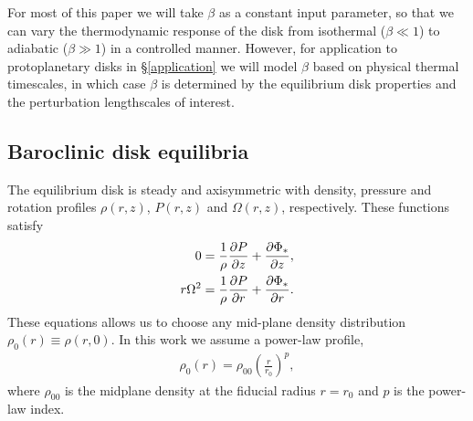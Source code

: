 For most of this paper we will take $\beta$ as a constant input
parameter, so that we can vary the thermodynamic response of the
disk from isothermal ($\beta\ll 1$) to adiabatic ($\beta \gg 1$) in a
controlled manner. However, for application to protoplanetary disks in 
\S\ref{application} we will model $\beta$ based on physical thermal
timescales, in which case $\beta$ is determined by the equilibrium
disk properties and the perturbation lengthscales of interest.  

\subsection{Baroclinic disk equilibria}\label{eqm}
The equilibrium disk is steady and axisymmetric with density,
pressure and rotation profiles $\rho(r,z)$, $P(r,z)$ and
$\Omega(r,z)$, respectively. These functions satisfy  
\begin{align}
  0 &= \frac{1}{\rho}\frac{\partial P}{\partial z} + \frac{\partial \Phi_*}{\partial z},\label{vert_equilibrium}\\
  r\Omega^2&= \frac{1}{\rho}\frac{\partial P}{\partial r} + \frac{\partial \Phi_*}{\partial
    r}.\label{hori_equilibrium} 
\end{align} 
These equations allows us to choose any mid-plane density 
distribution $\rho_0(r)\equiv \rho(r,0)$. In this work we assume a
power-law profile, 
\begin{align}
  \rho_0(r) = \rho_{00}\left(\frac{r}{r_0}\right)^p,
\end{align}
where $\rho_{00}$ is the midplane density at the fiducial radius
$r=r_0$ and $p$ is the power-law index.  

